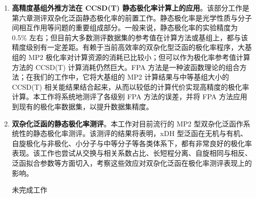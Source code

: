 \begin{enumerate}[nosep]
  \item \textbf{高精度基组外推方法在 CCSD(T) 静态极化率计算上的应用}。该部分工作是第六章测评双杂化泛函静态极化率的前置工作。静态极化率是光学性质与分子间相互作用等问题的重要组成部分。一般来说，静态极化率的实验精度为 0.5\% 左右；但目前大多数测评数据集的参考值在计算方法或基组上，都与该精度级别有一定差距。有赖于当前高效率的双杂化型泛函的极化率程序，大基组的 MP2 极化率对计算资源的消耗已比较小；但可以作为极化率参考值计算方法的 CCSD(T) 计算消耗仍然巨大。FPA 方法是一种波函数理论的组合方法；在我们的工作中，它将大基组的 MP2 计算结果与中等基组大小的 CCSD(T) 相关能结果结合起来，从而以较低的计算代价实现高精度的极化率计算。本工作将系统地测评了各级别 FPA 方法的误差，并将 FPA 方法应用到现有的极化率数据集，以提升数据集精度。
  
  \item \textbf{双杂化泛函的静态极化率测评}。本工作对目前流行的 MP2 型双杂化泛函作系统性的静态极化率测评。该测评的结果将表明，xDH 型泛函在无机与有机、自旋极化与非极化、小分子与中等分子等各类体系下，都有非常良好的极化率表现。该工作也尝试从交换与相关系数占比、长短程分离、自旋相同与相反、泛函拟合参数等方面切入，考察这些效应对双杂化泛函在极化率测评表现上的影响。
  
  \alert{未完成工作}
\end{enumerate}

\newpage

